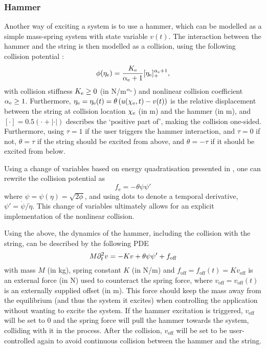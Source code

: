 \documentclass{article}
\begin{document}
\subsubsection{Hammer}
Another way of exciting a system is to use a hammer, which can be modelled as a simple mass-spring system with state variable $v(t)$. The interaction between the hammer and the string is then modelled as a collision, using the following collision potential \cite{Hertz1881}:
\begin{equation}\label{eq:potential}
    \phi(\eta_{\text{e}}) = \frac{K_{\text{e}}}{\alpha_{\text{e}}+1}[\eta_{\text{e}}]_+^{\alpha_{\text{e}}+1},
\end{equation}
with collision stiffness $K_{\text{e}} \geq 0$ (in N/m$^{\alpha_{\text{e}}}$) and nonlinear collision coefficient $\alpha_{\text{e}} \geq 1$. Furthermore, $\eta_{\text{e}} = \eta_{\text{e}}(t) = \theta\left(u(\chi_{\text{e}}, t) - v(t)\right)$ is the relative displacement between the string at collision location $\chi_{\text{e}}$ (in m) and the hammer (in m), and $[\cdot] = 0.5 (\cdot + |\cdot|)$ describes the `positive part of', making the collision one-sided. Furthermore, using $\tau = 1$ if the user triggers the hammer interaction, and $\tau = 0$ if not, $\theta = \tau$ if the string should be excited from above, and $\theta = -\tau$ if it should be excited from below.

Using a change of variables based on energy quadratisation presented in \cite{Ducceschi2021}, one can rewrite the collision potential as
\begin{equation}
    f_\text{e} = -\theta\psi \psi'
\end{equation}
where $\psi = \psi(\eta) = \sqrt{2\phi}$, and using dots to denote a temporal derivative, $\psi' = \dot \psi / \dot \eta$. This change of variables ultimately allows for an explicit implementation of the nonlinear collision. 

Using the above, the dynamics of the hammer, including the collision with the string, can be described by the following PDE
\begin{equation}
    M\partial_t^2 v = -K v + \theta \psi\psi' + f_\text{off}
\end{equation}
with mass $M$ (in kg), spring constant $K$ (in N/m) and $f_\text{off} = f_\text{off}(t) = K v_\text{off}$ is an external force (in N) used to counteract the spring force, where $v_\text{off} = v_\text{off}(t)$ is an externally supplied offset (in m). This force should keep the mass away from the equilibrium (and thus the system it excites) when controlling the application without wanting to excite the system. If the hammer excitation is triggered, $v_\text{off}$ will be set to $0$ and the spring force will pull the hammer towards the system, colliding with it in the process. After the collision, $v_\text{off}$ will be set to be user-controlled again to avoid continuous collision between the hammer and the string. 
\end{document}
